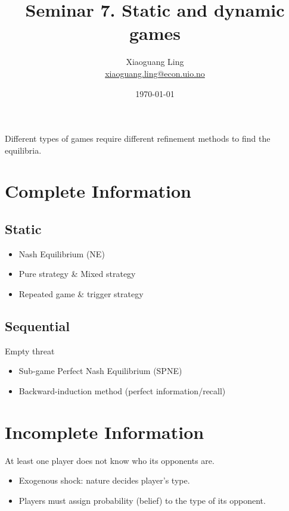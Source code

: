 \documentclass{article}
\title{Seminar 7. Static and dynamic games}
\author{Xiaoguang Ling \\  \href{xiaoguang.ling@econ.uio.no}{xiaoguang.ling@econ.uio.no}}
\date{\today}
\begin{document}
\maketitle

\begin{mdframed}[backgroundcolor=blue!20,linecolor=white]

Different types of games require different refinement methods
to find the equilibria.
\section*{Complete Information}

\subsection*{\hspace{4mm} Static}

\begin{itemize}
\item Nash Equilibrium (NE)
\item Pure strategy \& Mixed strategy
\item Repeated game \& trigger strategy
\end{itemize}


\subsection*{\hspace{4mm}Sequential}
\hspace{4mm} Empty threat 
\begin{itemize}	
\item Sub-game Perfect Nash Equilibrium (SPNE)
\item Backward-induction method (perfect information/recall)
\end{itemize}

\section*{Incomplete Information}
At least one player does not know who its opponents are.
\begin{itemize}
\item Exogenous shock: nature decides player's type.
\item Players must assign probability (belief) to the type of its opponent.
\end{itemize}

\end{mdframed}
\end{document}
